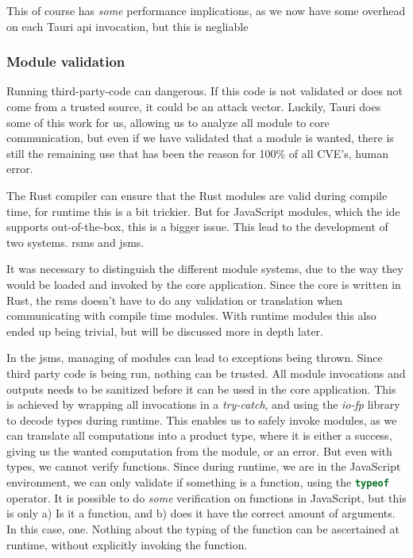 This of course has \textit{some} performance implications, as we now have some overhead on
each Tauri \gls*{api} invocation, but this is negliable\footnotemark{}


\subsubsection{Module validation}

Running third-party-code can dangerous. If this code is not validated or does
not come from a trusted source, it could be an attack vector. Luckily, Tauri does
some of this work for us, allowing us to analyze all module to core
communication, but even if we have validated that a module is wanted, there is
still the remaining use that has been the reason for 100\% of all CVE's, human
error.

The Rust compiler can ensure that the Rust modules are valid during compile
time, for runtime this is a bit trickier. But for JavaScript modules, which the
\gls*{ide} supports out-of-the-box, this is a bigger issue. This lead to the
development of two systems. \gls*{rsms} and \gls*{jsms}.

It was necessary to distinguish the different module systems, due to the way
they would be loaded and invoked by the core application. Since the core is
written in Rust, the \gls*{rsms} doesn't have to do any validation or
translation when communicating with compile time modules. With runtime modules
this also ended up being trivial, but will be discussed more in depth later.

In the \gls*{jsms}, managing of modules can lead to exceptions being thrown.
Since third party code is being run, nothing can be trusted. All module
invocations and outputs needs to be sanitized before it can be used in the core
application. This is achieved by wrapping all invocations in a
\textit{try-catch}, and using the \textit{io-fp} library to decode types during
runtime. This enables us to safely invoke modules, as we can translate all
computations into a product type, where it is either a success, giving us the
wanted computation from the module, or an error. But even with types, we cannot
verify functions. Since during runtime, we are in the JavaScript environment,
we can only validate if something is a function, using the
\lstinline[language=JavaScript]{typeof} operator. It is possible to do
\textit{some} verification on functions in JavaScript, but this is only a) Is it
a function, and b) does it have the correct amount of arguments. In this case,
one. Nothing about the typing of the function can be ascertained at runtime,
without explicitly invoking the function.

